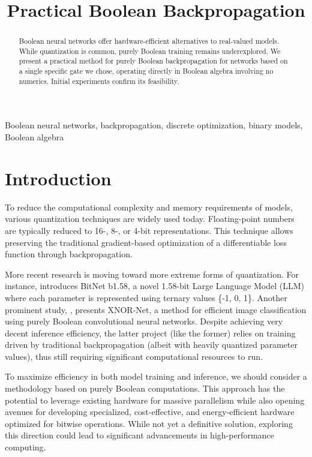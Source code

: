\documentclass[pmlr]{jmlr}
\title[Practical Boolean Backpropagation]{Practical Boolean Backpropagation}
\author{\Name{Simon Golbert} \Email{simongolbert@proton.me}}
\begin{document}
\maketitle

\begin{abstract}
    Boolean neural networks offer hardware-efficient alternatives to real-valued models. While quantization is common, purely Boolean training remains underexplored. We present a practical method for purely Boolean backpropagation for networks based on a single specific gate we chose, operating directly in Boolean algebra involving no numerics. Initial experiments confirm its feasibility.
\end{abstract}

\begin{keywords}
    Boolean neural networks, backpropagation, discrete optimization, binary models, Boolean algebra
\end{keywords}

\section{Introduction}
\label{sec:intro}
To reduce the computational complexity and memory requirements of models, various quantization techniques are widely used today. Floating-point numbers are typically reduced to 16-, 8-, or 4-bit representations. This technique allows preserving the traditional gradient-based optimization of a differentiable loss function through backpropagation.

More recent research is moving toward more extreme forms of quantization. For instance, \citep{ma2024} introduces BitNet b1.58, a novel 1.58-bit Large Language Model (LLM) where each parameter is represented using ternary values \{-1, 0, 1\}. Another prominent study, \citep{rastegari2016}, presents XNOR-Net, a method for efficient image classification using purely Boolean convolutional neural networks. Despite achieving very decent inference efficiency, the latter project (like the former) relies on training driven by traditional backpropagation (albeit with heavily quantized parameter values), thus still requiring significant computational resources to run.

To maximize efficiency in both model training and inference, we should consider a methodology based on purely Boolean computations. This approach has the potential to leverage existing hardware for massive parallelism while also opening avenues for developing specialized, cost-effective, and energy-efficient hardware optimized for bitwise operations. While not yet a definitive solution, exploring this direction could lead to significant advancements in high-performance computing.
\end{document}
